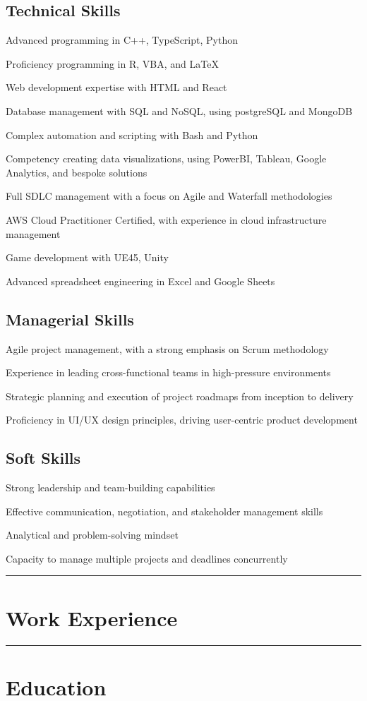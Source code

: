 \documentclass[10.75pt]{article}
\let\tempone\itemize
\let\temptwo\enditemize
\renewenvironment{itemize}{\tempone\addtolength{\itemsep}{-0.5\baselineskip}}{\temptwo}
\newcommand{\hr}{
	\par\noindent
	\vspace*{0pt}
	\rule{\textwidth}{1pt}
	\vspace*{-10pt}
}
\begin{document}
	\subsection*{Technical Skills}
	\begin{itemize}
		\item Advanced programming in C++, TypeScript, Python
		\item Proficiency programming in R, VBA, and LaTeX
		\item Web development expertise with HTML and React
		\item Database management with SQL and NoSQL, using postgreSQL and MongoDB
		\item Complex automation and scripting with Bash and Python
		\item Competency creating data visualizations, using PowerBI, Tableau, Google Analytics, and bespoke solutions
		\item Full SDLC management with a focus on Agile and Waterfall methodologies
		\item AWS Cloud Practitioner Certified, with experience in cloud infrastructure management
		\item Game development with \gls{UE45}, \gls{Unity}
		\item Advanced spreadsheet engineering in Excel and Google Sheets
	\end{itemize}

	\subsection*{Managerial Skills}
	\begin{itemize}
		\item Agile project management, with a strong emphasis on Scrum methodology
		\item Experience in leading cross-functional teams in high-pressure environments
		\item Strategic planning and execution of project roadmaps from inception to delivery
		\item Proficiency in UI/UX design principles, driving user-centric product development
	\end{itemize}

	\subsection*{Soft Skills}
	\begin{itemize}
		\item Strong leadership and team-building capabilities
		\item Effective communication, negotiation, and stakeholder management skills
		\item Analytical and problem-solving mindset
		\item Capacity to manage multiple projects and deadlines concurrently
	\end{itemize}

	\hr{}

	\section*{Work Experience}
	\workexperience{}

	\hr{}
	
	\section*{Education}
	\education{}
\end{document}
